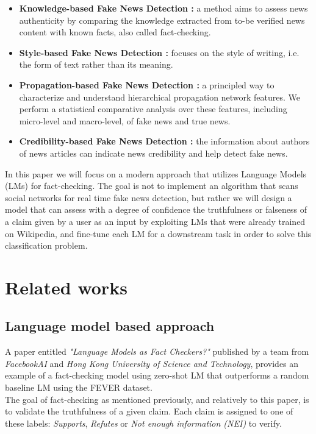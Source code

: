 \documentclass[conference]{IEEEtran}
\begin{document}
\begin{itemize}
\item \textbf{Knowledge-based Fake News Detection \cite{chernyavskiy2021whatthewikifact}:} a method aims to assess news authenticity by comparing the knowledge extracted from to-be verified news content with known facts, also called fact-checking.
\item \textbf{Style-based Fake News Detection \cite{przybyla2020capturing}:} focuses on the style of writing, i.e. the form of text rather than its meaning.
\item \textbf{Propagation-based Fake News Detection \cite{shu2020hierarchical}:} a principled way to characterize and understand hierarchical propagation network features. We perform a statistical comparative analysis over these features, including micro-level and macro-level, of fake news and true news.
\item \textbf{Credibility-based Fake News Detection \cite{sitaula2020credibility}:} the information about authors of news articles can indicate news credibility and help detect fake news.
\end{itemize}

In this paper we will focus on a modern approach that utilizes Language Models (LMs) for fact-checking. The goal is not to implement an algorithm that scans social networks for real time fake news detection, but rather we will design a model that can assess with a degree of confidence the truthfulness or falseness of a claim given by a user as an input by exploiting LMs that were already trained on Wikipedia, and fine-tune each LM for a downstream task in order to solve this classification problem.

\section{Related works}
\subsection{Language model based approach \cite{lee2020language} \cite{petroni2019language}}
A paper entitled \textit{"Language Models as Fact Checkers?"} published by a team from \textit{FacebookAI} and \textit{Hong Kong University of Science and Technology}, provides an example of a fact-checking model using zero-shot LM that outperforms a random baseline LM using the FEVER dataset\cite{thorne2018fever}.\\

The goal of fact-checking as mentioned previously, and relatively to this paper, is to validate the truthfulness of a given claim. Each claim is assigned to one of these labels: \textit{Supports}, \textit{Refutes} or \textit{Not enough information (NEI)} to verify.\\
\end{document}
